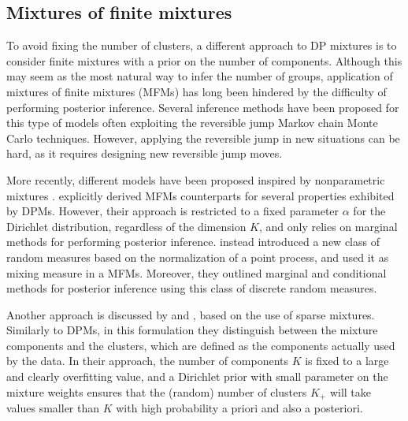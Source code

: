 \subsection{Mixtures of finite mixtures}
To avoid fixing the number of clusters, a different approach to DP mixtures is to consider finite mixtures with a prior on the number of components. Although this may seem as the most natural way to infer the number of groups, application of mixtures of finite mixtures (MFMs) has long been hindered by the difficulty of performing posterior inference. 
Several inference methods have been proposed for this type of models \parencite{McCullagh2008,nobile2004,nobile2007,richardson1997} often exploiting the reversible jump Markov chain Monte Carlo techniques. However, applying the reversible jump in new situations can be hard, as it requires designing new reversible jump moves.

More recently, different models have been proposed inspired by nonparametric mixtures \parencite{miller2018, argiento2019}. \textcite{miller2018} explicitly derived MFMs counterparts for several properties exhibited by DPMs. However, their approach is restricted to a fixed parameter $\alpha$ for the Dirichlet distribution, regardless of the dimension $K$, and only relies on marginal methods for performing posterior inference.
\textcite{argiento2019} instead introduced a new class of random measures based on the normalization of a point process, 
and used it as mixing measure in a MFMs. Moreover, they outlined marginal and conditional methods for posterior inference using this class of discrete random measures.

Another approach is discussed by \textcite{malsinerwalli2016} and \textcite{fs2019}, based on the use of sparse mixtures. Similarly to DPMs, in this formulation they distinguish between the mixture components and the clusters, which are defined as the components actually used by the data. In their approach, the number of components $K$ is fixed to a large and clearly overfitting value, and a Dirichlet prior with small parameter on the mixture weights ensures that the (random) number of clusters $K_+$ will take values smaller than $K$ with high probability a priori and also a posteriori.

